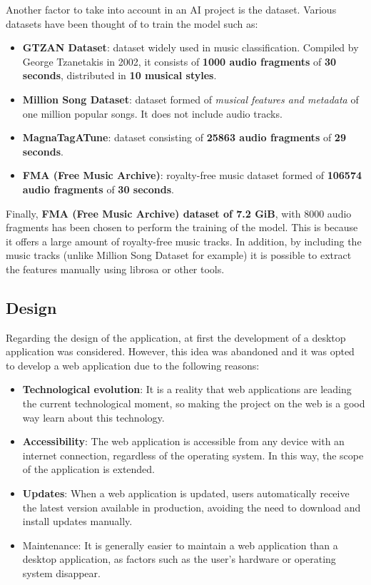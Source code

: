 Another factor to take into account in an AI project is the dataset. Various datasets have been thought of to train the model such as:
\begin{itemize}

\item \textbf{GTZAN Dataset}: dataset widely used in music classification. Compiled by George Tzanetakis in 2002, it consists of \textbf{1000 audio fragments} of \textbf{30 seconds}, distributed in \textbf{10 musical styles}.

\item \textbf{Million Song Dataset}: dataset formed of \textit{musical features and metadata} of one million popular songs. It does not include audio tracks.

\item \textbf{MagnaTagATune}: dataset consisting of \textbf{25863 audio fragments} of \textbf{29 seconds}.

\item \textbf{FMA (Free Music Archive)}: royalty-free music dataset formed of \textbf{106574 audio fragments} of \textbf{30 seconds}. 

\end{itemize}

Finally, \textbf{FMA (Free Music Archive) dataset of 7.2 GiB}, with 8000 audio fragments has been chosen to perform the training of the model. This is because it offers a large amount of royalty-free music tracks. 
In addition, by including the music tracks (unlike Million Song Dataset for example) it is possible to extract the features manually using librosa or other tools.

\subsection{Design}

Regarding the design of the application, at first the development of a desktop application was considered. However, this idea was abandoned and it was opted to develop a web application due to the following reasons:

\begin{itemize}
\item \textbf{Technological evolution}: It is a reality that web applications are leading the current technological moment, so making the project on the web is a good way learn about this technology.

\item \textbf{Accessibility}: The web application is accessible from any device with an internet connection, regardless of the operating system. In this way, the scope of the application is extended.

\item \textbf{Updates}: When a web application is updated, users automatically receive the latest version available in production, avoiding the need to download and install updates manually. 

\item {Maintenance}: It is generally easier to maintain a web application than a desktop application, as factors such as the user's hardware or operating system disappear.
\end{itemize}


